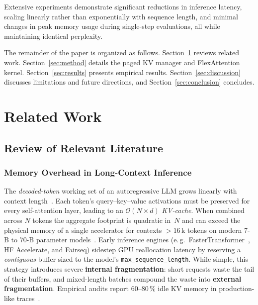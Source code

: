 \documentclass[conference]{IEEEtran}
\begin{document}
Extensive experiments demonstrate significant reductions in inference latency, scaling linearly rather than exponentially with sequence length, and minimal changes in peak memory usage during single-step evaluations, all while maintaining identical perplexity.

The remainder of the paper is organized as follows.  Section~\ref{sec:related} reviews related work.  Section~\ref{sec:method} details the paged KV manager and FlexAttention kernel.  Section~\ref{sec:results} presents empirical results.  Section~\ref{sec:discussion} discusses limitations and future directions, and Section~\ref{sec:conclusion} concludes.


\section{Related Work}\label{sec:related}

\subsection{Review of Relevant Literature}\label{subsec:review}

\subsubsection{Memory Overhead in Long-Context Inference}
The \emph{decoded-token} working set of an autoregressive LLM grows linearly with context length~\cite{shoeybi2019megatron}.  
Each token's query–key–value activations must be preserved for every self-attention layer, leading to an $\mathcal{O}(N\! \times\! d)$ \textit{KV-cache}.  
When combined across $N$ tokens the aggregate footprint is quadratic in~$N$ and can exceed the physical memory of a single accelerator for contexts $>16$\,k tokens on modern 7-B to 70-B parameter models~\cite{kwon2023pagedattention}.  
Early inference engines (e.\,g.\ FasterTransformer~\cite{fastertransformer2021}, HF Accelerate, and Fairseq) sidestep GPU reallocation latency by reserving a \emph{contiguous} buffer sized to the model's \texttt{max\_sequence\_length}.  
While simple, this strategy introduces severe \textbf{internal fragmentation}: short requests waste the tail of their buffers, and mixed-length batches compound the waste into \textbf{external fragmentation}.  
Empirical audits report 60–80\,\% idle KV memory in production-like traces~\cite{kwon2023pagedattention,deepspeed2023blog}.
\end{document}
